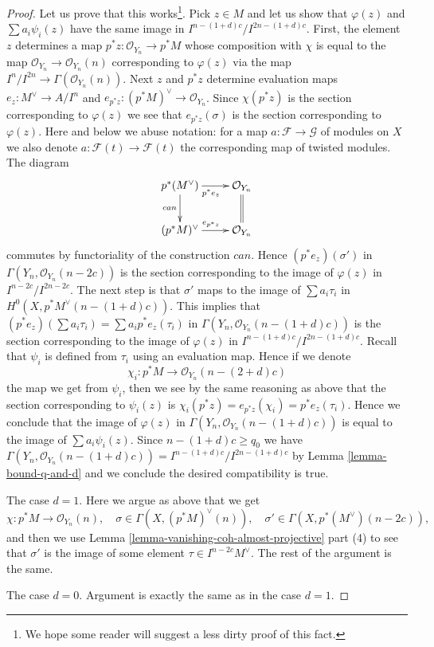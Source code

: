 \documentclass{stacks-project}
\theoremstyle{plain}
\theoremstyle{definition}
\theoremstyle{remark}
\numberwithin{equation}{subsection}
\begin{document}
\begin{proof}
\medskip\noindent
Let us prove that this works\footnote{We hope some reader will suggest
a less dirty proof of this fact.}. Pick $z \in M$ and let us show that
$\varphi(z)$ and $\sum a_i \psi_i(z)$ have the same image in
$I^{n - (1 + d)c}/I^{2n - (1 + d)c}$.
First, the element $z$ determines a map
$p^*z : \mathcal{O}_{Y_n} \to p^*M$ whose composition with
$\chi$ is equal to the map $\mathcal{O}_{Y_n} \to \mathcal{O}_{Y_n}(n)$
corresponding to $\varphi(z)$ via the map
$I^n/I^{2n} \to \Gamma(\mathcal{O}_{Y_n}(n))$.
Next $z$ and $p^*z$ determine evaluation maps
$e_z : M^\vee \to A/I^n$ and $e_{p^*z} : (p^*M)^\vee \to \mathcal{O}_{Y_n}$.
Since $\chi(p^*z)$ is the section corresponding to $\varphi(z)$
we see that $e_{p^*z}(\sigma)$ is the section corresponding to $\varphi(z)$.
Here and below we abuse notation: for a map
$a : \mathcal{F} \to \mathcal{G}$ of modules on $X$
we also denote $a : \mathcal{F}(t) \to \mathcal{F}(t)$ the corresponding
map of twisted modules. The diagram
$$
\xymatrix{
p^*(M^\vee) \ar[d]_{can} \ar[r]_{p^*e_z} & \mathcal{O}_{Y_n} \ar@{=}[d] \\
(p^*M)^\vee \ar[r]^{e_{p^*z}} & \mathcal{O}_{Y_n}
}
$$
commutes by functoriality of the construction $can$. Hence
$(p^*e_z)(\sigma')$ in $\Gamma(Y_n, \mathcal{O}_{Y_n}(n - 2c))$
is the section corresponding to the image of $\varphi(z)$
in $I^{n - 2c}/I^{2n - 2c}$.
The next step is that $\sigma'$ maps to the image
of $\sum a_i \tau_i$ in $H^0(X, p^*M^\vee(n - (1 + d)c))$.
This implies that $(p^*e_z)(\sum a_i \tau_i) = \sum a_i p^*e_z(\tau_i)$
in $\Gamma(Y_n, \mathcal{O}_{Y_n}(n - (1 + d)c))$ is the section corresponding
to the image of $\varphi(z)$ in $I^{n - (1 + d)c}/I^{2n - (1 + d)c}$.
Recall that $\psi_i$ is defined from $\tau_i$ using an evaluation
map. Hence if we denote
$$
\chi_i : p^*M \longrightarrow \mathcal{O}_{Y_n}(n - (2 + d)c)
$$
the map we get from $\psi_i$, then we see by the same reasoning
as above that the section corresponding to $\psi_i(z)$ is
$\chi_i(p^*z) = e_{p^*z}(\chi_i) = p^*e_z(\tau_i)$. Hence we conclude that
the image of $\varphi(z)$ in $\Gamma(Y_n, \mathcal{O}_{Y_n}(n - (1 + d)c))$
is equal to the image of $\sum a_i\psi_i(z)$.
Since $n - (1 + d)c \geq q_0$ we have
$\Gamma(Y_n, \mathcal{O}_{Y_n}(n - (1 + d)c)) =
I^{n - (1 + d)c}/I^{2n - (1 + d)c}$ by Lemma \ref{lemma-bound-q-and-d} and
we conclude the desired compatibility is true.

\medskip\noindent
The case $d = 1$. Here we argue as above that we get
$$
\chi : p^*M \longrightarrow \mathcal{O}_{Y_n}(n),\quad
\sigma \in \Gamma(X, (p^*M)^\vee(n)),\quad
\sigma' \in \Gamma(X, p^*(M^\vee)(n - 2c)),
$$
and then we use
Lemma \ref{lemma-vanishing-coh-almost-projective} part (4)
to see that $\sigma'$ is the image of some element
$\tau \in I^{n - 2c}M^\vee$. The rest of the argument is the same.

\medskip\noindent
The case $d = 0$. Argument is exactly the same as in the
case $d = 1$.
\end{proof}
\end{document}
